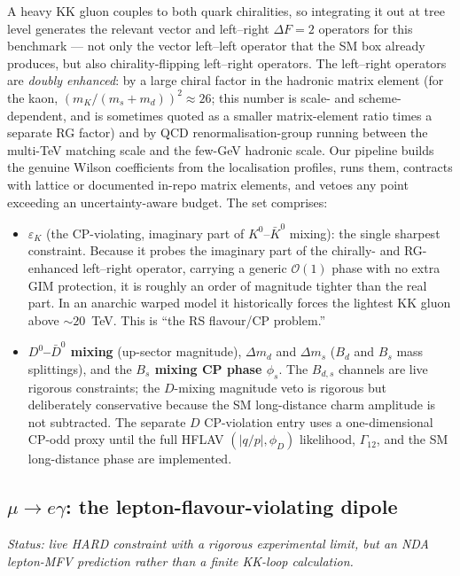 \documentclass[11pt]{article}
\newcommand{\epsK}{\varepsilon_K}
\newcommand{\dmd}{\Delta m_d}
\newcommand{\dms}{\Delta m_s}
\newcommand{\phis}{\phi_s}
\begin{document}
A heavy KK gluon couples to both quark chiralities, so integrating it out at
tree level generates the relevant vector and left--right $\Delta F=2$ operators
for this benchmark --- not only the vector left--left operator that the SM box
already produces, but also chirality-flipping left--right operators. The
left--right operators are
\emph{doubly enhanced}: by a large chiral factor in the hadronic matrix element
(for the kaon, $(m_K/(m_s+m_d))^2 \approx 26$; this number is scale- and
scheme-dependent, and is sometimes quoted as a smaller matrix-element ratio
times a separate RG factor) and by QCD renormalisation-group
running between the multi-TeV matching scale and the few-GeV hadronic scale.
Our pipeline builds the genuine Wilson coefficients from the localisation
profiles, runs them, contracts with lattice or documented in-repo matrix
elements, and vetoes any point exceeding an uncertainty-aware budget. The set
comprises:
\begin{itemize}[leftmargin=1.4em]
\item \textbf{$\epsK$} (the CP-violating, imaginary part of $K^0$--$\bar K^0$
mixing): the single sharpest constraint. Because it probes the imaginary part of
the chirally- and RG-enhanced left--right operator, carrying a generic
$\mathcal{O}(1)$ phase with no extra GIM protection, it is roughly an order of
magnitude tighter than the real part. In an anarchic warped model it historically
forces the lightest KK gluon above $\sim 20$~TeV. This is ``the RS flavour/CP
problem.''
\item \textbf{$D^0$--$\bar D^0$ mixing} (up-sector magnitude), \textbf{$\dmd$}
and \textbf{$\dms$} ($B_d$ and $B_s$ mass splittings), and the \textbf{$B_s$
mixing CP phase $\phis$}. The $B_{d,s}$ channels are live rigorous constraints;
the $D$-mixing magnitude veto is rigorous but deliberately conservative because
the SM long-distance charm amplitude is not subtracted. The separate $D$
CP-violation entry uses a one-dimensional CP-odd proxy until the full HFLAV
$(|q/p|,\phi_D)$ likelihood, $\Gamma_{12}$, and the SM long-distance phase are
implemented.
\end{itemize}

\subsection{$\mu\to e\gamma$: the lepton-flavour-violating dipole}

\emph{Status: live HARD constraint with a rigorous experimental limit, but an
NDA lepton-MFV prediction rather than a finite KK-loop calculation.}
\end{document}
